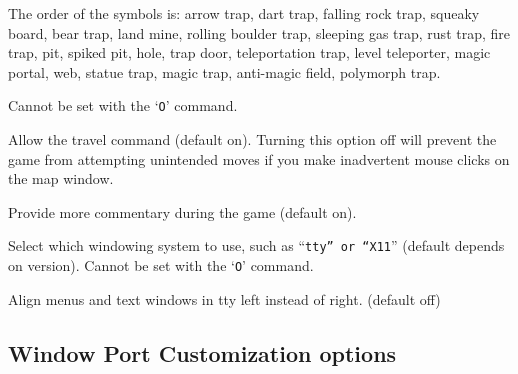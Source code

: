 The order of the symbols is: 
arrow trap, dart trap, falling rock trap, squeaky board, bear trap,
land mine, rolling boulder trap, sleeping gas trap, rust trap, fire trap,
pit, spiked pit, hole, trap door, teleportation trap, level teleporter,
magic portal, web, statue trap, magic trap, anti-magic field, polymorph trap.

Cannot be set with the `{\tt O}' command.
\item[\tb{travel}]
Allow the travel command (default on).  Turning this option off will
prevent the game from attempting unintended moves if you make inadvertent
mouse clicks on the map window.
\item[\tb{verbose}]
Provide more commentary during the game (default on).
\item[\tb{windowtype}]
Select which windowing system to use, such as ``{\tt tty'' or ``X11}''
(default depends on version).
Cannot be set with the `{\tt O}' command.
\item[\ib{win_edge}]
Align menus and text windows in tty left instead of right. (default off)
\elist
\subsection*{Window Port Customization options}

